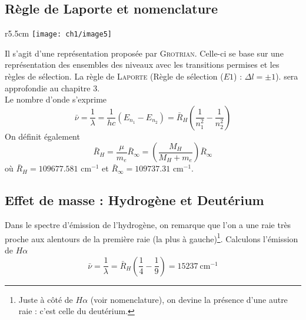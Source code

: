 \subsection{Règle de Laporte et nomenclature}
	\begin{wrapfigure}[13]{r}{5.5cm}
	\vspace{-5mm}
	\texttt{[image: ch1/image5]}
	\end{wrapfigure}
Il s'agit d'une représentation proposée par \textsc{Grotrian}. Celle-ci se base sur une représentation des
ensembles des niveaux avec les transitions permises et les règles de sélection. La règle de \textsc{Laporte} 
(Règle de sélection ($E1$) : $\Delta l = \pm 1$). sera approfondie au chapitre 3. \\

Le nombre d'onde s'exprime
\begin{equation}
\bar \nu = \frac{1}{\lambda} = \frac{1}{hc}(E_{n_1}-E_{n_2}) = \bar R_H\left(\frac{1}{n^2_1}-\frac{1}{n^2_2}
\right)
\end{equation}
On définit également
\begin{equation}
\bar{R}_H = \frac{\mu}{m_e}\bar{R}_\infty = \left(\frac{M_H}{M_H+m_e}\right)\bar{R}_\infty
\end{equation}
où $\bar{R}_H = 109677.581$ cm$^{-1}$ et $\bar{R}_\infty = 109737.31$ cm$^{-1}$.



\subsection{Effet de masse : Hydrogène et Deutérium}
Dans le spectre d'émission de l'hydrogène, on remarque que l'on a une raie très proche aux alentours de la
première raie (la plus à gauche)\footnote{Juste à côté de $H\alpha$ (voir nomenclature), on devine la présence
d'une autre raie : c'est celle du deutérium.}. Calculons l'émission de $H\alpha$
\begin{equation}
\bar\nu = \frac{1}{\lambda}= \bar{R}_H\left(\frac{1}{4}-\frac{1}{9}\right) = 15237\ \text{cm}^{-1}
\end{equation}


